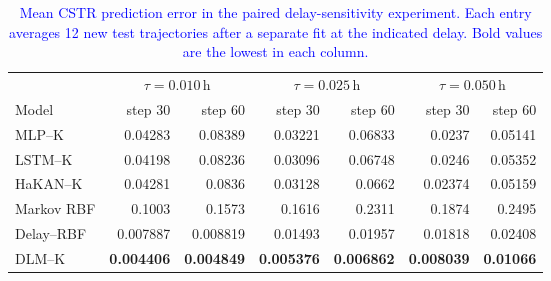 \begin{table}[pos=!htbp]
\color{blue}
\caption{\textcolor{blue}{Mean CSTR prediction error in the paired delay-sensitivity experiment. Each entry averages 12 new test trajectories after a separate fit at the indicated delay. Bold values are the lowest in each column.}}
\label{tab:cstr-delay-sensitivity}
\centering\small
\setlength{\tabcolsep}{5pt}
\begin{tabular}{@{}lrrrrrr@{}}
\toprule
& \multicolumn{2}{c}{$\tau=0.010\,\mathrm{h}$} & \multicolumn{2}{c}{$\tau=0.025\,\mathrm{h}$} & \multicolumn{2}{c}{$\tau=0.050\,\mathrm{h}$} \\
\cmidrule(lr){2-3}\cmidrule(lr){4-5}\cmidrule(l){6-7}
Model & step 30 & step 60 & step 30 & step 60 & step 30 & step 60 \\
\midrule
MLP--K & 0.04283 & 0.08389 & 0.03221 & 0.06833 & 0.0237 & 0.05141 \\
LSTM--K & 0.04198 & 0.08236 & 0.03096 & 0.06748 & 0.0246 & 0.05352 \\
HaKAN--K & 0.04281 & 0.0836 & 0.03128 & 0.0662 & 0.02374 & 0.05159 \\
Markov RBF & 0.1003 & 0.1573 & 0.1616 & 0.2311 & 0.1874 & 0.2495 \\
Delay--RBF & 0.007887 & 0.008819 & 0.01493 & 0.01957 & 0.01818 & 0.02408 \\
DLM--K & \textbf{0.004406} & \textbf{0.004849} & \textbf{0.005376} & \textbf{0.006862} & \textbf{0.008039} & \textbf{0.01066} \\
\bottomrule
\end{tabular}
\end{table}
